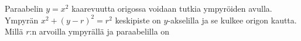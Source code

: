 \begin{tehtavasivu}
\begin{tehtava}
Paraabelin $y = x^2$ kaarevuutta origossa voidaan tutkia ympyröiden avulla. Ympyrän $x^2+(y-r)^2=r^2$ keskipiste on $y$-akselilla ja se kulkee origon kautta. Millä $r$:n arvoilla ympyrällä ja paraabelilla on
\begin{alakohdat}
\end{alakohdat}
\begin{vastaus}
\begin{alakohdat}
\end{alakohdat}
\end{vastaus}
\end{tehtava}

\end{tehtavasivu}

